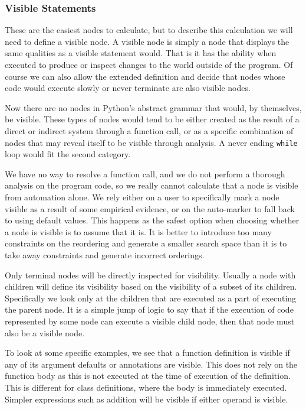 \documentclass[twoside,a4paper]{report}
\begin{document}
\subsubsection{Visible Statements}

These are the easiest nodes to calculate, but to describe this calculation we will need to define a visible node. A visible node is simply a node
that displays the same qualities as a visible statement would. That is it has the ability when executed to produce or inspect changes to the world
outside of the program. Of course we can also allow the extended definition and decide that nodes whose code would execute slowly or never terminate
are also visible nodes.

Now there are no nodes in Python's abstract grammar that would, by themselves, be visible. These types of nodes would tend to be either created as the
result of a direct or indirect system through a function call, or as a specific combination of nodes that may reveal itself to be visible through analysis.
A never ending \texttt{while} loop would fit the second category.

We have no way to resolve a function call, and we do not perform a thorough analysis on the program code, so we really cannot calculate that a node is
visible from automation alone. We rely either on a user to specifically mark a node visible as a result of some empirical evidence, or on the auto-marker
to fall back to using default values. This happens as the safest option when choosing whether a node is visible is to assume that it is. It is better to
introduce too many constraints on the reordering and generate a smaller search space than it is to take away constraints and generate incorrect orderings.

Only terminal nodes will be directly inspected for visibility. Usually a node with children will define its visibility based on the visibility of a subset
of its children. Specifically we look only at the children that are executed as a part of executing the parent node. It is a simple jump of logic to say
that if the execution of code represented by some node can execute a visible child node, then that node must also be a visible node.

To look at some specific examples, we see that a function definition is visible if any of its argument defaults or annotations are visible. This does not
rely on the function body as this is not executed at the time of execution of the definition. This is different for class definitions, where the body is
immediately executed. Simpler expressions such as addition will be visible if either operand is visible.
\end{document}
